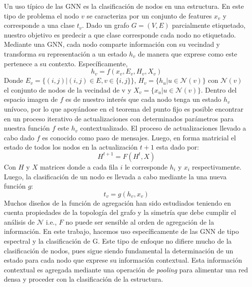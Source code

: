 	Un uso típico de las GNN es la clasificación de nodos en una estructura. En este tipo de problema el nodo $v$ se caracteriza por un conjunto de features $x_v$ y corresponde a una clase $t_v$. Dado un grafo $G = (V, E)$ parcialmente etiquetado, nuestro objetivo es predecir a que clase corresponde cada nodo no etiquetado. Mediante una GNN, cada nodo comparte información con su vecindad y transforma su representación a un estado $h_v$ de manera que exprese como este pertenece a su contexto. Específicamente,	
		\begin{equation}
			h_v = f(x_v, E_v, H_v, X_v)
		\end{equation}
	Donde $E_v = \{(i, j)| (i, j) \in E, v \in \{i, j\}\}$,  $H_v = \{h_u| u \in \mathcal{N}(v)\}$ con $\mathcal{N}(v)$ el conjunto de nodos de la vecindad de v y $X_v = \{x_u| u \in \mathcal{N}(v)\}$. Dentro del espacio imagen de $f$ es de nuestro interés que cada nodo tenga un estado $h_v$ unívoco, por lo que apoyándose en el teorema del punto fijo \citep{brown1988fixed} es posible encontrar en un proceso iterativo de actualizaciones con determinados parámetros para nuestra función $f$ este $h_v$ contextualizado. El proceso de actualizaciones llevado a cabo dado $f$ es conocido como paso de mensajes. Luego, en forma matricial el estado de todos los nodos en la actualización $t+1$ esta dado por:
	\begin{equation}
		H^{t+1} = F(H^t, X)
	\end{equation} 
	Con $H$ y $X$ matrices donde a cada fila $i$ le corresponde $h_i \text{ y } x_i$ respectivamente. Luego, la clasificación de un nodo es llevada a cabo mediante la una nueva función $g$:	
	\begin{equation}
		t_v = g(h_v, x_v)
	\end{equation}
	Muchos diseños de la función de agregación han sido estudiados \citep{kipf2017semisupervised} teniendo en cuenta propiedades de la topología del grafo y la simetría que debe cumplir el análisis de $\mathcal{N}$ i.e., $F$ no puede ser sensible al orden de agregación de la información. En este trabajo, hacemos uso específicamente de las GNN de tipo espectral \citep{Wu_2021} y la clasificación de G. Este tipo de enfoque no difiere mucho de la clasificación de nodos, pues sigue siendo fundamental la determinación de un estado para cada nodo que exprese su información contextual. Esta información contextual es agregada mediante una operación de \textit{pooling} para alimentar una red densa y proceder con la clasificación de la estructura.
	
